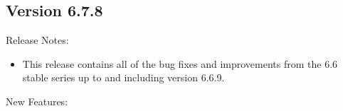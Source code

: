 \subsection{\label{sec:New-6-7-8}Version 6.7.8}

\noindent Release Notes:

\begin{itemize}

\item This release contains all of the bug fixes and improvements from
  the 6.6 stable series up to and including version 6.6.9.

\end{itemize}

\noindent New Features:

